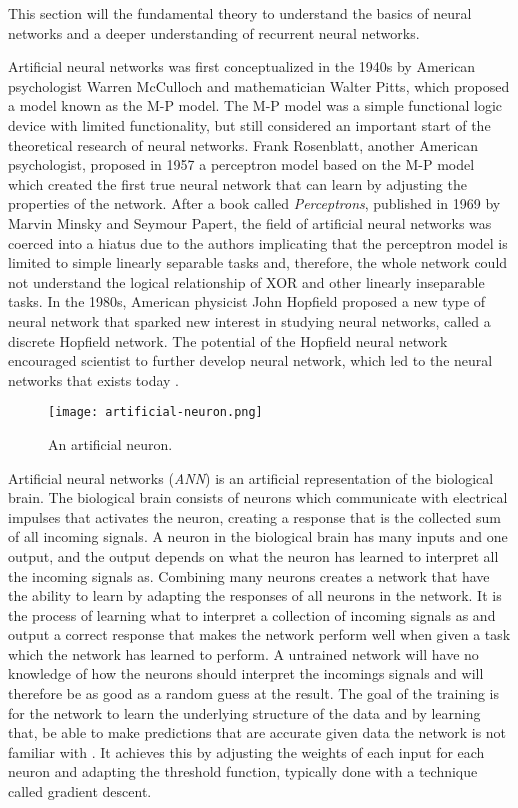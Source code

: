\documentclass[../main.tex]{subfiles}
\begin{document}
This section will the fundamental theory to understand the basics of neural networks and a deeper understanding of recurrent neural networks. 

Artificial neural networks was first conceptualized in the 1940s by American psychologist Warren McCulloch and mathematician Walter Pitts, which proposed a model known as the M-P model. The M-P model was a simple functional logic device with limited functionality, but still considered an important start of the theoretical research of neural networks. Frank Rosenblatt, another American psychologist, proposed in 1957 a perceptron model based on the M-P model which created the first true neural network that can learn by adjusting the properties of the network. After a book called \textit{Perceptrons}, published in 1969 by Marvin Minsky and Seymour Papert, the field of artificial neural networks was coerced into a hiatus due to the authors implicating that the perceptron model is limited to simple linearly separable tasks and, therefore, the whole network could not understand the logical relationship of XOR and other linearly inseparable tasks. In the 1980s, American physicist John Hopfield proposed a new type of neural network that sparked new interest in studying neural networks, called a discrete Hopfield network. The potential of the Hopfield neural network encouraged scientist to further develop neural network, which led to the neural networks that exists today \cite{Wu_2017}.
\begin{figure}[H]
\centering
\texttt{[image: artificial-neuron.png]}
\caption{An artificial neuron.}
\label{fig:neuron}
\end{figure}
Artificial neural networks (\textit{ANN}) is an artificial representation of the biological brain. The biological brain consists of neurons which communicate with electrical impulses that activates the neuron, creating a response that is the collected sum of all incoming signals. A neuron in the biological brain has many inputs and one output, and the output depends on what the neuron has learned to interpret all the incoming signals as. Combining many neurons creates a network that have the ability to learn by adapting the responses of all neurons in the network. It is the process of learning what to interpret a collection of incoming signals as and output a correct response that makes the network perform well when given a task which the network has learned to perform. A untrained network will have no knowledge of how the neurons should interpret the incomings signals and will therefore be as good as a random guess at the result. The goal of the training is for the network to learn the underlying structure of the data and by learning that, be able to make predictions that are accurate given data the network is not familiar with \cite{Gurney_1997}. It achieves this by adjusting the weights of each input for each neuron and adapting the threshold function, typically done with a technique called gradient descent.
\end{document}
